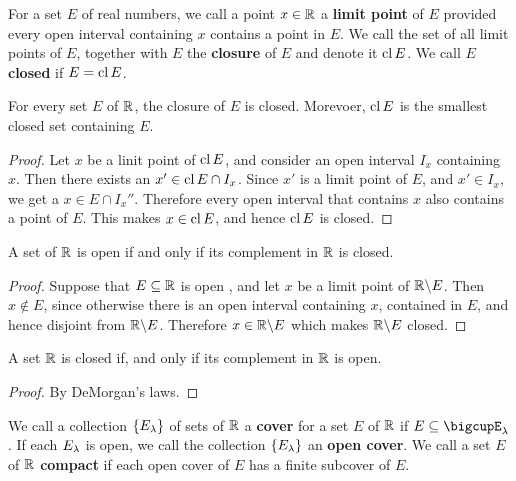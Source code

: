 \begin{definition}
    For a set $E$ of real numbers, we call a point  $x \in \mathbb{R}$ a  \textbf{limit
    point} of $E$ provided every open interval containing  $x$ contains a point
    in  $E$. We call the set of all limit points of  $E$, together with $E$ the
    \textbf{closure} of $E$ and denote it  $\operatorname{cl}{E}$. We call $E$
    \textbf{closed} if $E=\operatorname{cl}{E}$.
\end{definition}

\begin{lemma}\label{1.2.3}
    For every set $E$ of  $\mathbb{R}$, the closure of  $E$ is closed. Morevoer,
    $\operatorname{cl}{E}$ is the smallest closed set containing $E$.
\end{lemma}
\begin{proof}
    Let $x$ be a linit point of  $\operatorname{cl}{E}$, and consider an open interval $I_x$
    containing  $x$. Then there exists an  $x' \in \operatorname{cl}{E} \cap I_x$. Since $x'$ is a
    limit point of $E$, and $x' \in I_x$, we get a $x \in E \cap I_x''$. Therefore
    every open interval that contains $x$ also contains a point of  $E$. This
    makes $x \in \operatorname{cl}{E}$, and hence $\operatorname{cl}{E}$ is closed.
\end{proof}

\begin{lemma}\label{1.2.4}
    A set of $\mathbb{R}$ is open if and only if its complement in  $\mathbb{R}$ is closed.
\end{lemma}
\begin{proof}
    Suppose that $E \subseteq \mathbb{R}$ is open , and let  $x$ be a limit point of
    $\mathbb{R} \backslash E$. Then $x \notin E$, since otherwise there is an open interval
    containing  $x$, contained in  $E$, and hence disjoint from  $\mathbb{R} \backslash E$.
    Therefore $x \in \mathbb{R} \backslash E$ which makes $\mathbb{R} \backslash E$ closed.
\end{proof}
\begin{corollary}
    A set $\mathbb{R}$ is closed if, and only if its complement in  $\mathbb{R}$ is open.
\end{corollary}
\begin{proof}
    By DeMorgan's laws.
\end{proof}

\begin{definition}
    We call a collection $\{E_\lambda\}$ of sets of $\mathbb{R}$ a  \textbf{cover} for a set
    $E$ of  $\mathbb{R}$ if  $E \subseteq \bigcupE_\l$. If each  $E_\lambda$ is open, we call
    the collection $\{E_\lambda\}$ an \textbf{open cover}. We call a set $E$ of  $\mathbb{R}$
     \textbf{compact} if each open cover of $E$ has a finite subcover of  $E$.
\end{definition}

